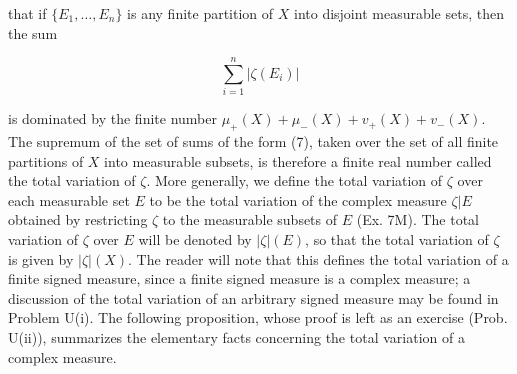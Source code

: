 that if $\{E_1, \ldots, E_n\}$ is any finite partition of $X$ into disjoint measurable sets, then the sum

$$\sum_{i=1}^{n} |\zeta(E_i)|$$

is dominated by the finite number $\mu_+(X) + \mu_-(X) + v_+(X) + v_-(X)$. The supremum of the set of sums of the form (7), taken over the set of all finite partitions of $X$ into measurable subsets, is therefore a finite real number called the total variation of $\zeta$. More generally, we define the total variation of $\zeta$ over each measurable set $E$ to be the total variation of the complex measure $\zeta|E$ obtained by restricting $\zeta$ to the measurable subsets of $E$ (Ex. 7M). The total variation of $\zeta$ over $E$ will be denoted by $|\zeta|(E)$, so that the total variation of $\zeta$ is given by $|\zeta|(X)$. The reader will note that this defines the total variation of a finite signed measure, since a finite signed measure is a complex measure; a discussion of the total variation of an arbitrary signed measure may be found in Problem U(i). The following proposition, whose proof is left as an exercise (Prob. U(ii)), summarizes the elementary facts concerning the total variation of a complex measure.
